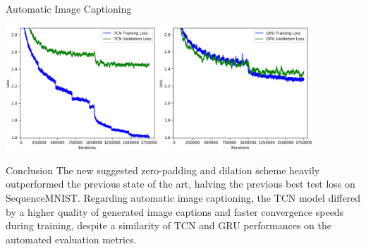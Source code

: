 \documentclass[paperwidth=24in,paperheight=48in, fontscale=0.4166666666666]{baposter}
\begin{document}
\begin{poster}
\begin{posterbox}[name=imagecaptioning,column=1,below=experiments]{Automatic Image Captioning}
\vspace{-7pt}

\begin{center}
\begin{minipage}{\textwidth}
\begin{center}
  \includegraphics[width=11.5cm]{tcngraphs.png}
\begin{minipage}{0.9\textwidth}
\end{minipage}
\end{center}
\end{minipage}
\end{center}
\vspace{-20pt}
\end{posterbox}

















\begin{posterbox}[name=conclusion,column=1,below=imagecaptioning, above=bottom]{Conclusion}
The new suggested zero-padding and dilation scheme heavily outperformed the previous state of the art, halving the previous best test loss on SequenceMNIST. Regarding automatic image captioning, the TCN model differed by a higher quality of generated image captions and faster convergence speeds during training, despite a similarity of TCN and GRU performances on the automated evaluation metrics.%
\end{posterbox}











\end{poster}
\end{document}
